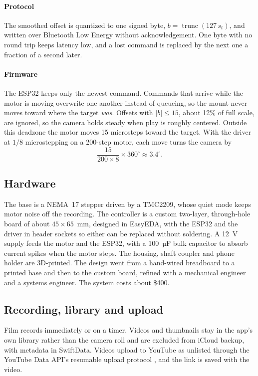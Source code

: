 \documentclass[letterpaper,11pt]{article}
\begin{document}
\paragraph{Protocol} The smoothed offset is quantized to one signed byte,
$b = \operatorname{trunc}(127\,s_t)$, and written over Bluetooth Low Energy without
acknowledgement. One byte with no round trip keeps latency low, and a lost command is replaced by
the next one a fraction of a second later.

\paragraph{Firmware} The ESP32 keeps only the newest command. Commands that arrive while the motor
is moving overwrite one another instead of queueing, so the mount never moves toward where the
target \emph{was}. Offsets with $|b| \le 15$, about 12\% of full scale, are ignored, so the camera
holds steady when play is roughly centered. Outside this deadzone the motor moves 15 microsteps
toward the target. With the driver at $1/8$ microstepping on a 200-step motor, each move turns the
camera by
\begin{equation}
\frac{15}{200 \times 8} \times 360^\circ \approx 3.4^\circ.
\label{e:step}\end{equation}

\subsection{Hardware}

The base is a NEMA~17 stepper driven by a TMC2209, whose quiet mode keeps motor noise off the
recording. The controller is a custom two-layer, through-hole board of about $45 \times 65$~mm,
designed in EasyEDA, with the ESP32 and the driver in header sockets so either can be replaced
without soldering. A 12~V supply feeds the motor and the ESP32, with a 100~µF bulk capacitor to
absorb current spikes when the motor steps. The housing, shaft coupler and phone holder are
3D-printed. The design went from a hand-wired breadboard to a printed base and then to the custom
board, refined with a mechanical engineer and a systems engineer. The system costs about \$400.

\subsection{Recording, library and upload}

Film records immediately or on a timer. Videos and thumbnails stay in the app's own library rather
than the camera roll and are excluded from iCloud backup, with metadata in SwiftData. Videos upload
to YouTube as unlisted through the YouTube Data API's resumable upload protocol
\citep{YouTubeUpload}, and the link is saved with the video.
\end{document}
